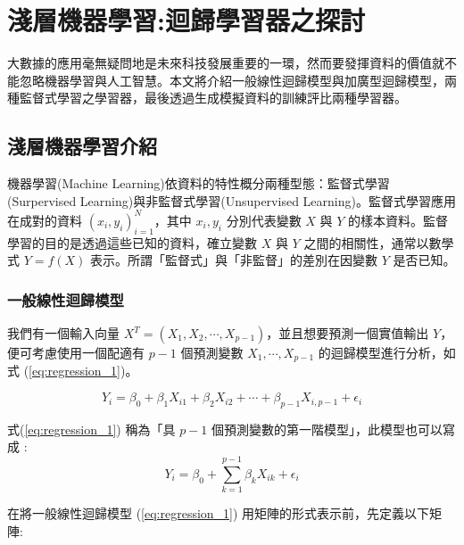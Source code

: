 %   
%

\chapter{淺層機器學習:迴歸學習器之探討}
大數據的應用毫無疑問地是未來科技發展重要的一環，然而要發揮資料的價值就不能忽略機器學習與人工智慧。本文將介紹一般線性迴歸模型與加廣型迴歸模型，兩種監督式學習之學習器，最後透過生成模擬資料的訓練評比兩種學習器。

\section{淺層機器學習介紹}

機器學習(Machine Learning)依資料的特性概分兩種型態：監督式學習(Surpervised Learning)與非監督式學習(Unsupervised Learning)。監督式學習應用在成對的資料 $(x_i, y_i)^{N}_{i = 1}$，其中 $x_i, y_i$ 分別代表變數 $X$ 與 $Y$ 的樣本資料。監督學習的目的是透過這些已知的資料，確立變數 $X$ 與 $Y$ 之間的相關性，通常以數學式 $Y = f(X)$ 表示。所謂「監督式」與「非監督」的差別在因變數 $Y$ 是否已知。

\subsection{一般線性迴歸模型}

我們有一個輸入向量 $X^T = (X_1, X_2, \cdots, X_{p-1})$，並且想要預測一個實值輸出 $Y$，便可考慮使用一個配適有 $p-1$ 個預測變數 $X_1, \cdots, X_{p-1}$ 的迴歸模型進行分析，如式 (\ref{eq:regression_1})。

\begin{equation}\label{eq:regression_1}
Y_i = \beta_0 + \beta_1 X_{i1} + \beta_2 X_{i2} + \cdots + \beta_{p-1} X_{i, p-1} + \epsilon_i
\end{equation}

式(\ref{eq:regression_1}) 稱為「具 $p-1$ 個預測變數的第一階模型」，此模型也可以寫成 :
\[Y_i = \beta_0 + \sum_{k = 1}^{p-1}\beta_k X_{ik} + \epsilon_i\]

在將一般線性迴歸模型 (\ref{eq:regression_1}) 用矩陣的形式表示前，先定義以下矩陣:

